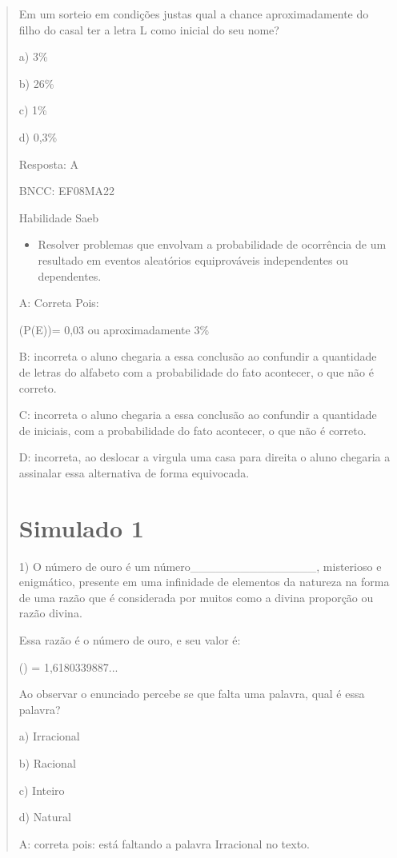 \begin{quote}
\begin{escolha}
Em um sorteio em condições justas qual a chance aproximadamente do filho
do casal ter a letra L como inicial do seu nome?

a) 3\%

b) 26\%

c) 1\%

d) 0,3\%

Resposta: A

BNCC: EF08MA22

Habilidade Saeb

\begin{itemize}
\tightlist
\item
  Resolver problemas que envolvam a probabilidade de ocorrência de um
  resultado em eventos aleatórios equiprováveis independentes ou
  dependentes.
\end{itemize}

A: Correta Pois:

(P(E))= 0,03 ou aproximadamente 3\%

B: incorreta o aluno chegaria a essa conclusão ao confundir a quantidade
de letras do alfabeto com a probabilidade do fato acontecer, o que não é
correto.

C: incorreta o aluno chegaria a essa conclusão ao confundir a quantidade
de iniciais, com a probabilidade do fato acontecer, o que não é correto.

D: incorreta, ao deslocar a virgula uma casa para direita o aluno
chegaria a assinalar essa alternativa de forma equivocada.

\section{Simulado 1}

1) O número de ouro é um número\_\_\_\_\_\_\_\_\_\_\_\_\_\_\_,
misterioso e enigmático, presente em uma infinidade de elementos da
natureza na forma de uma razão que é considerada por muitos como a
divina proporção ou razão divina.

Essa razão é o número de ouro, e seu valor é:

() = 1,6180339887...

Ao observar o enunciado percebe se que falta uma palavra, qual é essa
palavra?

a) Irracional

b) Racional

c) Inteiro

d) Natural

A: correta pois: está faltando a palavra Irracional no texto.


\end{escolha}
\end{quote}
